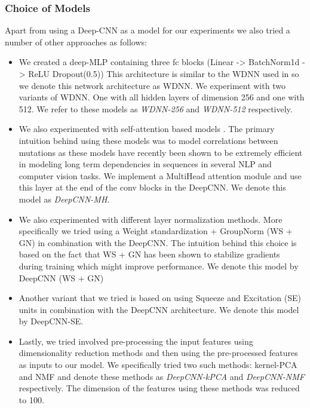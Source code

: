 \documentclass{article}
\begin{document}
\subsubsection{Choice of Models}
Apart from using a Deep-CNN as a model for our experiments we also tried a number of other approaches as follows:
\begin{itemize}
  \item We created a deep-MLP containing three fc blocks (Linear -> BatchNorm1d -> ReLU 
  Dropout(0.5))
  This architecture is similar to the WDNN used in \cite{CHEN2019356} so we denote this network architecture as WDNN. We
  experiment with two variants of WDNN. One with all hidden layers of dimension 256 and one with 512. We refer
  to these models as \emph{WDNN-256} and \emph{WDNN-512} respectively.
  \item We also experimented with self-attention based models \cite{vaswani2017attention}. The primary intuition behind using these models
  was to model correlations between mutations as these models have recently been shown to be extremely
  efficient in modeling long term dependencies in sequences in several NLP and computer vision tasks.
  We implement
  a MultiHead attention module and use this layer at the end of the conv blocks in the DeepCNN. We denote
  this model as \emph{DeepCNN-MH}.
  \item We also experimented with different layer normalization methods. More specifically we tried
  using a Weight standardization \cite{qiao2020microbatch} + GroupNorm \cite{wu2018group} (WS + GN) in combination with the DeepCNN. The intuition behind
  this choice is based on the fact that WS + GN has been shown to stabilize gradients during training
  which might improve performance. We denote this model by DeepCNN (WS + GN)
  \item Another variant that we tried is based on using Squeeze and Excitation \cite{hu2019squeezeandexcitation} (SE) units in combination
  with the DeepCNN architecture. We denote this model by DeepCNN-SE.
  \item Lastly, we tried involved pre-processing the input features using dimensionality reduction
  methods and then using the pre-processed features as inputs to our model.
  We specifically tried two such methods: kernel-PCA and NMF and denote these methods as \emph{DeepCNN-kPCA} and 
  \emph{DeepCNN-NMF} respectively. The dimension of the features using these methods was reduced to 100.

\end{itemize}
\end{document}
